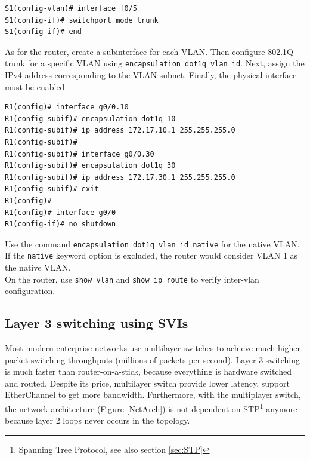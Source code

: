 \begin{verbatim}
S1(config-vlan)# interface f0/5
S1(config-if)# switchport mode trunk
S1(config-if)# end
\end{verbatim}

As for the router, create a subinterface for each VLAN. Then configure 802.1Q trunk for a specific VLAN using \verb|encapsulation dot1q vlan_id|. Next, assign the IPv4 address corresponding to the VLAN subnet. Finally, the physical interface must be enabled. 

\begin{verbatim}
R1(config)# interface g0/0.10
R1(config-subif)# encapsulation dot1q 10
R1(config-subif)# ip address 172.17.10.1 255.255.255.0
R1(config-subif)# 
R1(config-subif)# interface g0/0.30
R1(config-subif)# encapsulation dot1q 30
R1(config-subif)# ip address 172.17.30.1 255.255.255.0
R1(config-subif)# exit
R1(config)# 
R1(config)# interface g0/0
R1(config-if)# no shutdown
\end{verbatim}

\note Use the command \verb|encapsulation dot1q vlan_id native| for the native VLAN. If the \verb|native| keyword option is excluded, the router would consider VLAN 1 as the native VLAN.\\

On the router, use \verb|show vlan| and \verb|show ip route| to verify inter-vlan configuration.

\subsection{Layer 3 switching using SVIs}

Most modern enterprise networks use multilayer switches to achieve much higher packet-switching throughputs (millions of packets per second). Layer 3 switching is much faster than router-on-a-stick, because everything is hardware switched and routed. Despite its price, multilayer switch provide lower latency, support EtherChannel to get more bandwidth. Furthermore, with the multiplayer switch, the network architecture (Figure \ref{NetArch}) is not dependent on STP\footnote{Spanning Tree Protocol, see also section \ref{sec:STP} } anymore because layer 2 loops never occurs in the topology.

